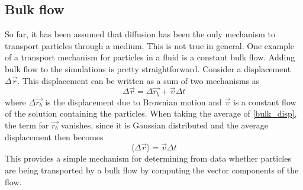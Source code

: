 \documentclass[11pt,letterpaper]{article}
\begin{document}
\subsection{Bulk flow}

So far, it has been assumed that diffusion has been the only mechanism to
transport particles through a medium. This is not true in general. One example
of a transport mechanism for particles in a fluid is a constant bulk flow.
Adding bulk flow to the simulations is pretty straightforward. Consider a
displacement $\Delta \vec{r}$. This displacement can be written as a sum of two
mechanisms as
\begin{equation}
    \Delta \vec{r} = \Delta \vec{r_b} + \vec{v} \Delta t
    \label{bulk_disp}
\end{equation}
where $\Delta \vec{r_b}$ is the displacement due to Brownian motion and
$\vec{v}$ is a constant flow of the solution containing the particles. When
taking the average of \eqref{bulk_disp}, the term for $\vec{r_b}$ vanishes,
since it is Gaussian distributed and the average displacement then becomes
\begin{equation}
    \langle \Delta \vec{r} \rangle = \vec{v} \Delta t
\end{equation}
This provides a simple mechanism for determining from data whether particles are
being transported by a bulk flow by computing the vector components of the
flow.\\
\end{document}
